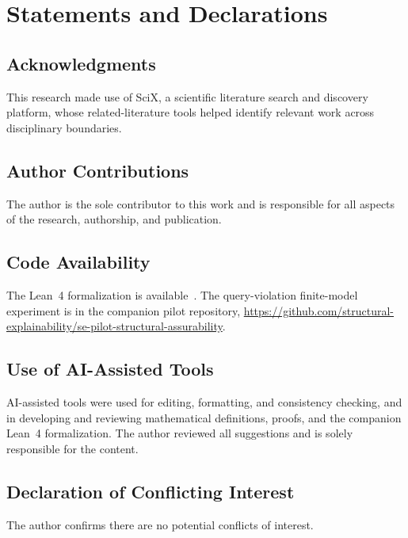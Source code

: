 \documentclass[11pt]{article}
\theoremstyle{plain}
\theoremstyle{definition}
\theoremstyle{remark}
\begin{document}
\section*{Statements and Declarations}

\subsection*{Acknowledgments}
This research made use of SciX,
a scientific literature search and discovery platform,
whose related-literature tools helped identify relevant work across disciplinary boundaries.

\subsection*{Author Contributions}
The author is the sole contributor to this work
and is responsible for all aspects of the research, authorship, and publication.

\subsection*{Code Availability}
The Lean~4 formalization is available~\citep{case2026sestructuralassurability}.
The query-violation finite-model experiment is in the companion pilot repository,
\url{https://github.com/structural-explainability/se-pilot-structural-assurability}.

\subsection*{Use of AI-Assisted Tools}
AI-assisted tools were used for editing, formatting, and consistency checking,
and in developing and reviewing mathematical definitions, proofs,
and the companion Lean~4 formalization.
The author reviewed all suggestions and is solely responsible for the content.

\subsection*{Declaration of Conflicting Interest}
The author confirms there are no potential conflicts of interest.




\end{document}
